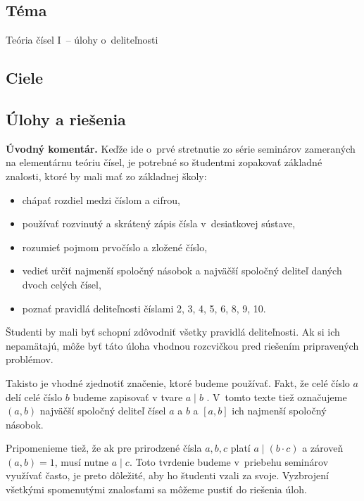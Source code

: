 

\subsection*{Téma}
Teória čísel I~-- úlohy o~deliteľnosti
\subsection*{Ciele}


\subsection*{Úlohy a riešenia}

\textbf{Úvodný komentár.} Keďže ide o~prvé stretnutie zo série seminárov zameraných na elementárnu teóriu čísel, je potrebné so študentmi zopakovať základné znalosti, ktoré by mali mať zo základnej školy:
\begin{itemize}
\item chápať rozdiel medzi číslom a cifrou,
\item používať rozvinutý a skrátený zápis čísla v~desiatkovej sústave,
\item rozumieť pojmom prvočíslo a zložené číslo,
\item vedieť určiť najmenší spoločný násobok a najväčší spoločný deliteľ daných dvoch celých čísel,
\item poznať pravidlá deliteľnosti číslami 2, 3, 4, 5, 6, 8, 9, 10.
\end{itemize}
Študenti by mali byť schopní zdôvodniť všetky pravidlá deliteľnosti. Ak si ich nepamätajú, môže byť táto úloha vhodnou rozcvičkou pred riešením pripravených problémov.

Takisto je vhodné zjednotiť značenie, ktoré budeme používať.  Fakt, že celé číslo $a$ delí celé číslo $b$ budeme zapisovať v tvare $a \mid b$ . V~tomto texte tiež označujeme $(a,b)$ najväčší spoločný deliteľ čísel $a$ a $b$ a $[a,b]$ ich najmenší spoločný násobok.

Pripomenieme tiež, že ak pre prirodzené čísla $a, b, c$ platí $a \mid (b\cdot c)$ a zároveň $(a,b)=1$, musí nutne $a\mid c$. Toto tvrdenie budeme v~priebehu seminárov využívať často, je preto dôležité, aby ho študenti vzali za svoje. Vyzbrojení všetkými spomenutými znalosťami sa môžeme pustiť do riešenia úloh.
\\


